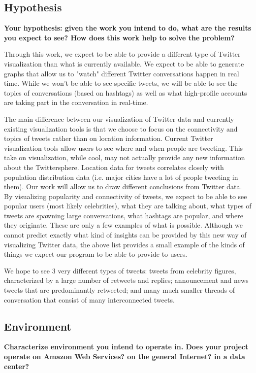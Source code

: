 \subsection{Hypothesis} \label{sec:hypothesis}
\textbf{Your hypothesis: given the work you intend to do, what are the results you expect to see? How does this work help to solve the problem?}

Through this work, we expect to be able to provide a different type of Twitter visualization than what is currently available.
We expect to be able to generate graphs that allow us to "watch" different Twitter conversations happen in real time. While
we won't be able to see specific tweets, we will be able to see the topics of conversations (based on hashtags) as well as
what high-profile accounts are taking part in the conversation in real-time.

The main difference between our visualization of Twitter data and currently existing visualization tools is that we choose
to focus on the connectivity and topics of tweets rather than on location information. Current Twitter visualization tools
allow users to see where and when people are tweeting. This take on visualization, while cool, may not actually provide
any new information about the Twittersphere. Location data for tweets correlates closely with population distribution data (i.e.
major cities have a lot of people tweeting in them). Our work will allow us to draw different conclusions from Twitter
data. By visualizing popularity and connectivity of tweets, we expect to be able to see popular users (most likely
celebrities), what they are talking about, what types of tweets are spawning large conversations, what hashtags are
popular, and where they originate. These are only a few examples of what is possible. Although we cannot predict exactly
what kind of insights can be provided by this new way of visualizing Twitter data, the above list provides a small example
of the kinds of things we expect our program to be able to provide to users.

We hope to see 3 very different types of tweets: tweets from celebrity figures, characterized by a large number of retweets
and replies; announcement and news tweets that are predominantly retweeted; and many much smaller threads of conversation
that consist of many interconnected \@reply tweets. 

\subsection{Environment}
\textbf{Characterize environment you intend to operate in. Does your project operate on Amazon Web Services? on the general Internet? in a data center?}

